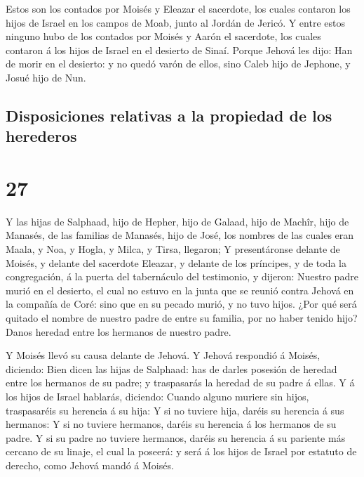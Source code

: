  Estos son los contados por Moisés y Eleazar el sacerdote,
los cuales contaron los hijos de Israel en los campos de Moab, junto al
Jordán de Jericó.  Y entre estos ninguno hubo de los
contados por Moisés y Aarón el sacerdote, los cuales contaron á los
hijos de Israel en el desierto de Sinaí.  Porque Jehová les
dijo: Han de morir en el desierto: y no quedó varón de ellos, sino Caleb
hijo de Jephone, y Josué hijo de Nun.

\hypertarget{disposiciones-relativas-a-la-propiedad-de-los-herederos}{%
\subsection{Disposiciones relativas a la propiedad de los
herederos}\label{disposiciones-relativas-a-la-propiedad-de-los-herederos}}

\hypertarget{section-26}{%
\section{27}\label{section-26}}

 Y las hijas de Salphaad, hijo de Hepher, hijo de Galaad,
hijo de Machîr, hijo de Manasés, de las familias de Manasés, hijo de
José, los nombres de las cuales eran Maala, y Noa, y Hogla, y Milca, y
Tirsa, llegaron;  Y presentáronse delante de Moisés, y
delante del sacerdote Eleazar, y delante de los príncipes, y de toda la
congregación, á la puerta del tabernáculo del testimonio, y dijeron:
 Nuestro padre murió en el desierto, el cual no estuvo en la
junta que se reunió contra Jehová en la compañía de Coré: sino que en su
pecado murió, y no tuvo hijos.  ¿Por qué será quitado el
nombre de nuestro padre de entre su familia, por no haber tenido hijo?
Danos heredad entre los hermanos de nuestro padre.

 Y Moisés llevó su causa delante de Jehová.  Y
Jehová respondió á Moisés, diciendo:  Bien dicen las hijas
de Salphaad: has de darles posesión de heredad entre los hermanos de su
padre; y traspasarás la heredad de su padre á ellas.  Y á
los hijos de Israel hablarás, diciendo: Cuando alguno muriere sin hijos,
traspasaréis su herencia á su hija:  Y si no tuviere hija,
daréis su herencia á sus hermanos:  Y si no tuviere
hermanos, daréis su herencia á los hermanos de su padre.  Y
si su padre no tuviere hermanos, daréis su herencia á su pariente más
cercano de su linaje, el cual la poseerá: y será á los hijos de Israel
por estatuto de derecho, como Jehová mandó á Moisés.

